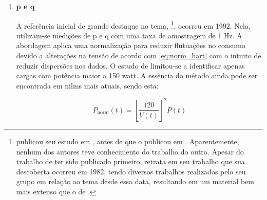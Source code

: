 \begin{enumerate}[label=\textbf{1.\arabic*},wide=\parindent]
\item \textbf{\Acrlong{p} e \Acrlong{q}}
\label{nilm:pot_real_reat}

\indent A referência inicial de grande destaque no tema,
\citet*{nilm_hart_1992_8}\footnote{\citet*{nilm_sultanem_1991_10}
publicou seu estudo em \citeyear{nilm_sultanem_1991_10}, antes de
\citeauthor*{nilm_hart_1992_8} que o publicou em
\citeyear{nilm_hart_1992_8}. Aparentemente, nenhum dos autores teve
conhecimento do trabalho do outro. Apesar do trabalho de
\citeauthor*{nilm_sultanem_1991_10} ter sido publicado primeiro,
\citeauthor*{nilm_hart_1992_8} retrata em seu trabalho que sua descoberta
ocorreu em 1982, tendo diversos trabalhos realizados pelo seu grupo em
relação ao tema desde essa data, resultando em um material bem mais
extenso que o de \citeauthor*{nilm_sultanem_1991_10}.}, ocorreu em
1992. Nela, utilizam-se medições de
\gls{p} e \gls{q} com uma taxa de amostragem de 1 Hz. A abordagem
aplica uma normalização para reduzir flutuações no consumo devido a
alterações na tensão de acordo com \ref{eq:norm_hart} com o intuito de
reduzir dispersões nos dados. O estudo de \citeauthor*{nilm_hart_1992_8}
limitou-se a identificar apenas cargas com potência maior a 150
\acs{watt}. A essência do método ainda pode ser encontrada
em \glspl{nilm} mais atuais, sendo esta:

\begin{equation} \label{eq:norm_hart}
P_{\text{norm}}(t) = \left[ \frac{120}{V(t)} \right]^2 P(t)
\end{equation}


\end{enumerate}
